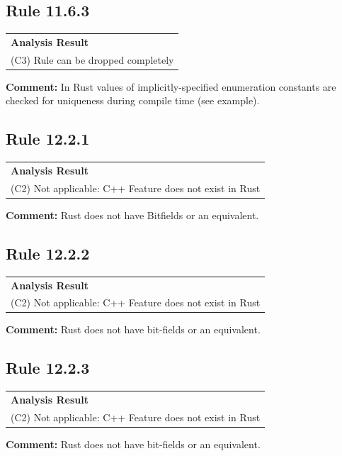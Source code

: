 \subsection*{Rule 11.6.3}
\begin{longtable}{p{13cm}}
\textbf{Analysis Result} \\
(C3) Rule can be dropped completely \\
\end{longtable}
\textbf{Comment:} In Rust values of implicitly-specified enumeration constants are checked for uniqueness during compile time (see example). \\


\subsection*{Rule 12.2.1}
\begin{longtable}{p{13cm}}
\textbf{Analysis Result} \\
(C2) Not applicable: C++ Feature does not exist in Rust \\
\end{longtable}
\textbf{Comment:} Rust does not have Bitfields or an equivalent. \\
\subsection*{Rule 12.2.2}
\begin{longtable}{p{13cm}}
\textbf{Analysis Result} \\
(C2) Not applicable: C++ Feature does not exist in Rust \\
\end{longtable}
\textbf{Comment:} Rust does not have bit-fields or an equivalent. \\
\subsection*{Rule 12.2.3}
\begin{longtable}{p{13cm}}
\textbf{Analysis Result} \\
(C2) Not applicable: C++ Feature does not exist in Rust \\
\end{longtable}
\textbf{Comment:} Rust does not have bit-fields or an equivalent. \\

